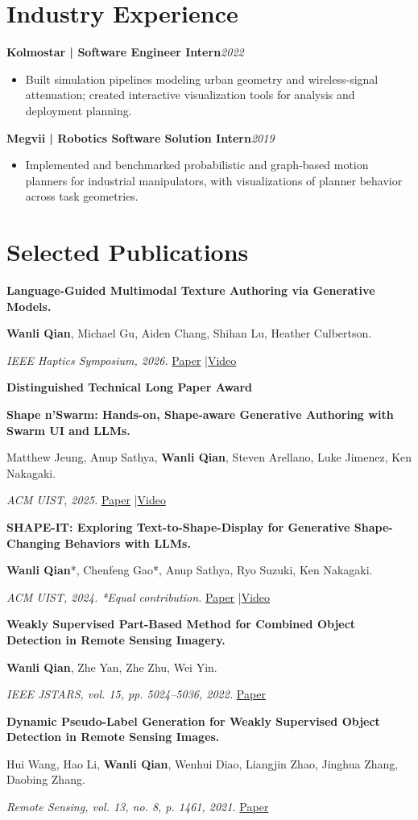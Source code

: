 \documentclass[11pt,letterpaper]{article}
\newcommand{\role}[2]{\textbf{#1}\hfill\textit{#2}\par}
\newcommand{\pub}[3]{\textbf{#1}\par #2\par #3\par\vspace{7pt}}
\begin{document}
\section*{Industry Experience}
\role{Kolmostar | Software Engineer Intern}{2022}
\begin{itemize}
\item Built simulation pipelines modeling urban geometry and wireless-signal attenuation; created interactive visualization tools for analysis and deployment planning.
\end{itemize}
\vspace{3pt}
\role{Megvii | Robotics Software Solution Intern}{2019}
\begin{itemize}
\item Implemented and benchmarked probabilistic and graph-based motion planners for industrial manipulators, with visualizations of planner behavior across task geometries.
\end{itemize}
\newpage
\section*{Selected Publications}
\pub{Language-Guided Multimodal Texture Authoring via Generative Models.}{\textbf{Wanli Qian}, Michael Gu, Aiden Chang, Shihan Lu, Heather Culbertson.}{\textit{IEEE Haptics Symposium, 2026.} \enspace \href{https://arxiv.org/abs/2604.06489}{Paper} \enspace|\enspace \href{https://youtu.be/f5vz52uPw-4}{Video}\par\textbf{Distinguished Technical Long Paper Award}}
\pub{Shape n'Swarm: Hands-on, Shape-aware Generative Authoring with Swarm UI and LLMs.}{Matthew Jeung, Anup Sathya, \textbf{Wanli Qian}, Steven Arellano, Luke Jimenez, Ken Nakagaki.}{\textit{ACM UIST, 2025.} \enspace \href{https://dl.acm.org/doi/10.1145/3746059.3747781}{Paper} \enspace|\enspace \href{https://www.youtube.com/watch?v=5u0M9yL7tyY}{Video}}
\pub{SHAPE-IT: Exploring Text-to-Shape-Display for Generative Shape-Changing Behaviors with LLMs.}{\textbf{Wanli Qian}*, Chenfeng Gao*, Anup Sathya, Ryo Suzuki, Ken Nakagaki.}{\textit{ACM UIST, 2024. *Equal contribution.} \enspace \href{https://dl.acm.org/doi/10.1145/3654777.3676348}{Paper} \enspace|\enspace \href{https://www.youtube.com/watch?v=2NxzOBc7AdQ}{Video}}
\pub{Weakly Supervised Part-Based Method for Combined Object Detection in Remote Sensing Imagery.}{\textbf{Wanli Qian}, Zhe Yan, Zhe Zhu, Wei Yin.}{\textit{IEEE JSTARS, vol. 15, pp. 5024--5036, 2022.} \enspace \href{https://ieeexplore.ieee.org/document/9789416}{Paper}}
\pub{Dynamic Pseudo-Label Generation for Weakly Supervised Object Detection in Remote Sensing Images.}{Hui Wang, Hao Li, \textbf{Wanli Qian}, Wenhui Diao, Liangjin Zhao, Jinghua Zhang, Daobing Zhang.}{\textit{Remote Sensing, vol. 13, no. 8, p. 1461, 2021.} \enspace \href{https://www.mdpi.com/2072-4292/13/8/1461}{Paper}}
\end{document}
